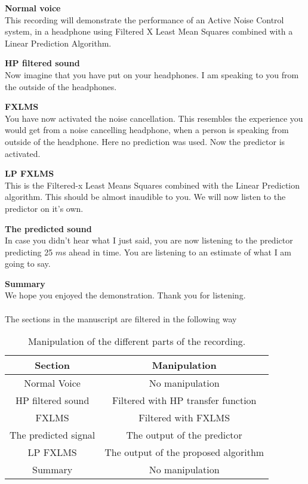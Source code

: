 \textbf{Normal voice}\\
This recording will demonstrate the performance of an Active Noise Control  system, in a headphone using Filtered X Least Mean Squares combined with a Linear Prediction Algorithm. 

\textbf{HP filtered sound}\\
Now imagine that you have put on your headphones. I am speaking to you from the outside of the headphones.

\textbf{FXLMS}\\
You have now activated the noise cancellation. This resembles the experience you would get from a noise cancelling headphone, when a person is speaking from outside of the headphone. 
Here no prediction was used. Now the predictor is activated. 

\textbf{LP FXLMS}\\
This is the Filtered-x Least Means Squares combined with the Linear Prediction algorithm. This should be almost inaudible to you. We will now listen to the predictor on it's own. 

\textbf{The predicted sound}\\
In case you didn't hear what I just said, you are now listening to the predictor predicting 25 $m$s ahead in time. You are listening to an estimate of what I am going to say.  

\textbf{Summary}\\
We hope you enjoyed the demonstration. Thank you for listening.\\\\

The sections in the manuscript are filtered in the following way
\begin{table}[H]
	\centering
	\begin{tabular}{ c c } \toprule
		{Section}				& {Manipulation} \\ \bottomrule 
		Normal Voice			& No manipulation  	\\
		HP filtered sound		& Filtered with HP transfer function \\
		FXLMS					& Filtered with FXLMS	\\
		The predicted signal 	& The output of the predictor	\\
		LP FXLMS 				& The output of the proposed algorithm	\\
		Summary 				& No manipulation	\\
		\bottomrule
	\end{tabular}
	\caption{Manipulation of the different parts of the recording.}
	\label{tab:VoiceRecSections}
\end{table}













